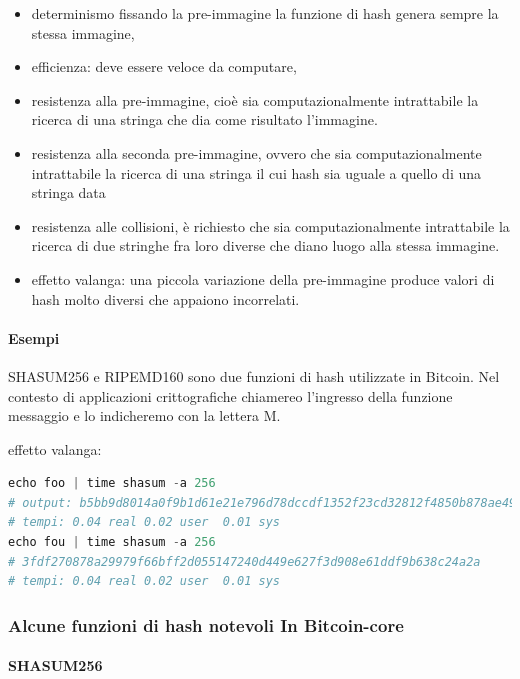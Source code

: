 \documentclass{article}
\begin{document}
\begin{itemize}
    \item determinismo fissando la pre-immagine la funzione di hash genera sempre la stessa immagine,
    \item efficienza: deve essere veloce da computare,
    \item resistenza alla pre-immagine, cioè sia computazionalmente intrattabile la ricerca di una stringa che dia come risultato l'immagine.
    \item resistenza alla seconda pre-immagine, ovvero che sia computazionalmente intrattabile la ricerca di una stringa il cui hash sia uguale a quello di una stringa data
    \item resistenza alle collisioni, è richiesto che sia computazionalmente intrattabile la ricerca di due stringhe fra loro diverse che diano luogo alla stessa immagine.
    \item effetto valanga: una piccola variazione della pre-immagine produce valori di hash molto diversi che appaiono incorrelati.
\end{itemize}

\paragraph{Esempi}

SHASUM256 e RIPEMD160 sono due funzioni di hash utilizzate in Bitcoin.
Nel contesto di applicazioni crittografiche chiamereo l'ingresso della funzione messaggio e lo indicheremo con la lettera M.

effetto valanga:

\begin{lstlisting}[language=Python]
echo foo | time shasum -a 256
# output: b5bb9d8014a0f9b1d61e21e796d78dccdf1352f23cd32812f4850b878ae4944c
# tempi: 0.04 real 0.02 user  0.01 sys
echo fou | time shasum -a 256
# 3fdf270878a29979f66bff2d055147240d449e627f3d908e61ddf9b638c24a2a
# tempi: 0.04 real 0.02 user  0.01 sys
\end{lstlisting}

\subsubsection{Alcune funzioni di hash notevoli In Bitcoin-core}

\paragraph{SHASUM256}
\end{document}
